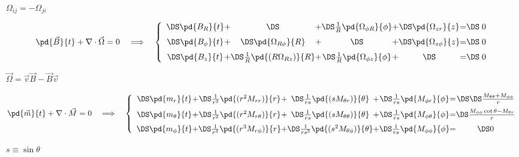 \documentclass{article}
\begin{document}
$ \Omega_{ij} = -\Omega_{ji} $
\pagebreak

\[     \pd{\vec{B}}{t} + \nabla\cdot\vec{\Omega} = 0
     \quad \Longrightarrow \quad \left\{
     \begin{array}{c@{+}c@{+}c@{+}c@{=}c}
     \DS \pd{B_{R}}{t}                                & \DS
                                                    & \DS
     \frac{1}{R}\pd{\Omega_{\phi R}}{\phi} & \DS
            \pd{\Omega_{z r}}{z}       & \DS\; 0
     \\ \noalign{\medskip}
     \DS \pd{B_{\phi}}{t}                            & \DS
     \pd{\Omega_{R\phi}}{R}             & \DS
                                            & \DS
        \pd{\Omega_{z\phi}}{z}          & \DS\; 0
    \\ \noalign{\medskip}
    \DS \pd{B_z}{t}                       & \DS
    \frac{1}{R}\pd{(R  \Omega_{Rz})}{R}   & \DS
    \frac{1}{R}\pd{\Omega_{\phi z}}{\phi} & \DS
                                          & \DS\;  0
     \end{array}\right.
\]
\pagebreak

$ \vec{\Omega} = \vec{v}\vec{B} - \vec{B}\vec{v} $
\pagebreak

\[     \pd{\vec{m}}{t} + \nabla\cdot\vec{M} = 0
     \quad \Longrightarrow \quad
     \left\{
     \begin{array}{c@{+}c@{+}c@{+}c@{=}c}
       \DS \pd{m_{r}}{t}                            & \DS
       \frac{1}{r^2} \pd{(r^2M_{rr})}{r}           & \DS
      \frac{1}{rs}  \pd{(s  M_{\theta r})}{\theta} & \DS
       \frac{1}{rs}  \pd{    M_{\phi r}}{\phi}      & \DS
       \DS\frac{M_{\theta\theta} + M_{\phi\phi}}{r}
     \\ \noalign{\medskip}
     \DS \pd{m_{\theta}}{t}                        & \DS
     \frac{1}{r^2}\pd{(r^2M_{r\theta})}{r}          & \DS
     \frac{1}{rs} \pd{(s  M_{\theta\theta})}{\theta}  & \DS
     \frac{1}{rs} \pd{    M_{\phi\theta}}{\phi}     & \DS
     \frac{M_{\phi\phi}\cot\theta - M_{\theta r}}{r} 
     \\ \noalign{\medskip}
     \DS \pd{m_{\phi}}{t}                            & \DS
     \frac{1}{r^3} \pd{(r^3 M_{r\phi})}{r}           & \DS
     \frac{1}{rs^2}\pd{(s^2 M_{\theta\phi})}{\theta} & \DS
     \frac{1}{rs}  \pd{     M_{\phi\phi}}{\phi}         & \DS
        0 
     \end{array}\right.
\]
\pagebreak

$ s\equiv\sin\theta $
\pagebreak
\end{document}
